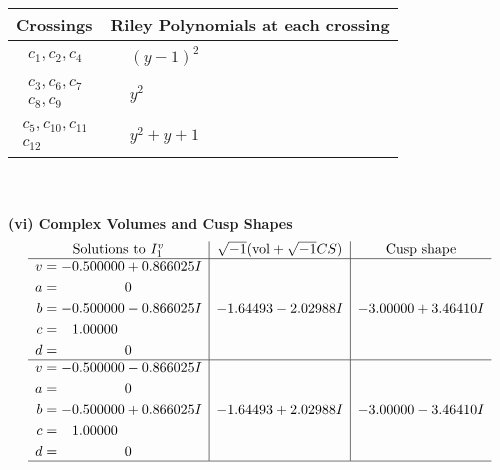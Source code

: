 \documentclass[1p]{elsarticle_modified}
\theoremstyle{definition}
\newcommand{\I}{\sqrt{-1}}
\begin{document}
\begin{tabular}{m{50pt}|m{274pt}}
Crossings & \hspace{64pt}Riley Polynomials at each crossing \\
\hline $$\begin{aligned}c_{1},c_{2},c_{4}\end{aligned}$$&$\begin{aligned}
&(y-1)^2
\end{aligned}$\\
\hline $$\begin{aligned}c_{3},c_{6},c_{7}\\c_{8},c_{9}\end{aligned}$$&$\begin{aligned}
&y^2
\end{aligned}$\\
\hline $$\begin{aligned}c_{5},c_{10},c_{11}\\c_{12}\end{aligned}$$&$\begin{aligned}
&y^2+y+1
\end{aligned}$\\
\hline
\end{tabular}\\~\\
\newpage\flushleft \textbf{(vi) Complex Volumes and Cusp Shapes}
$$\begin{array}{c|c|c}  
\text{Solutions to }I^v_{1}& \I (\text{vol} + \sqrt{-1}CS) & \text{Cusp shape}\\
 \hline 
\begin{aligned}
v &= -0.500000 + 0.866025 I \\
a &= \phantom{-0.000000 } 0 \\
b &= -0.500000 - 0.866025 I \\
c &= \phantom{-}1.00000\phantom{ +0.000000I} \\
d &= \phantom{-0.000000 } 0\end{aligned}
 & -1.64493 - 2.02988 I & -3.00000 + 3.46410 I \\ \hline\begin{aligned}
v &= -0.500000 - 0.866025 I \\
a &= \phantom{-0.000000 } 0 \\
b &= -0.500000 + 0.866025 I \\
c &= \phantom{-}1.00000\phantom{ +0.000000I} \\
d &= \phantom{-0.000000 } 0\end{aligned}
 & -1.64493 + 2.02988 I & -3.00000 - 3.46410 I\\
 \hline 
 \end{array}$$\newpage\newpage\renewcommand{\arraystretch}{1}
\end{document}
